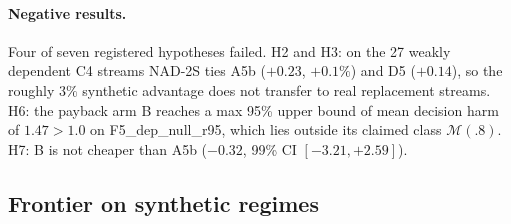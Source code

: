 \paragraph{Negative results.} Four of seven registered hypotheses failed. H2 and H3: on the 27 weakly
dependent C4 streams NAD-2S ties A5b ($+0.23$, $+0.1\%$) and D5 ($+0.14$), so the roughly $3\%$
synthetic advantage does not transfer to real replacement streams. H6: the payback arm B reaches a
max 95\% upper bound of mean decision harm of $1.47>1.0$ on F5\_dep\_null\_r95, which lies outside its
claimed class $\mathcal M(.8)$. H7: B is not cheaper than A5b ($-0.32$, 99\% CI $[-3.21,+2.59]$).

\subsection{Frontier on synthetic regimes}

